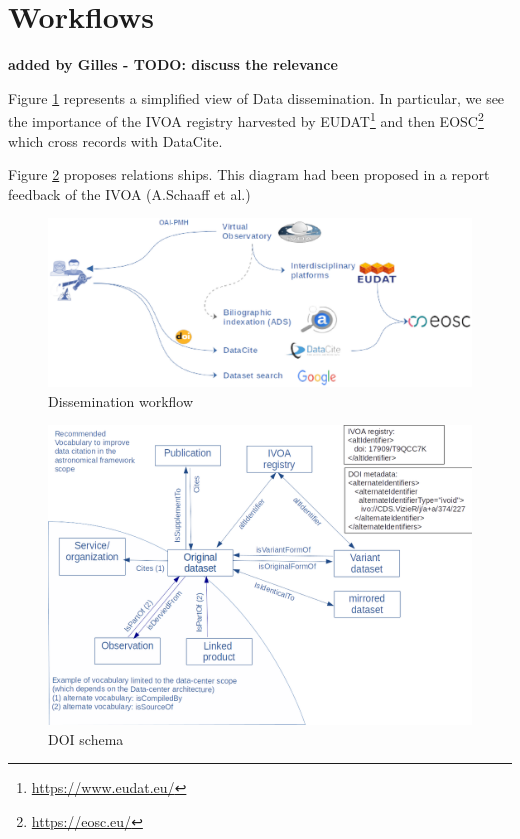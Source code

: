 \documentclass[11pt,a4paper]{ivoa}
\begin{document}
\section{Workflows}
\textbf{\color{red} added by Gilles - TODO: discuss the relevance}

Figure \ref{fig:diag-dissemination} represents a simplified view of Data dissemination.
In particular, we see the importance of the IVOA registry harvested by EUDAT\footnote{\url{https://www.eudat.eu/}} and then EOSC\footnote{\url{https://eosc.eu/}} which cross records with DataCite.


Figure \ref{fig:doi-schema} proposes relations ships. This diagram had been proposed in a report feedback of the IVOA (A.Schaaff et al.)

\begin{figure}[!h]
\centering
\includegraphics[width=\textwidth]{diag_dissemination2.eps}
\caption{Dissemination workflow}
\label{fig:diag-dissemination}
\end{figure}

\begin{figure}[!h]
	\centering
	\includegraphics[width=\textwidth]{schema-doi.png}
	\caption{DOI schema}
	\label{fig:doi-schema}
\end{figure}
\end{document}

